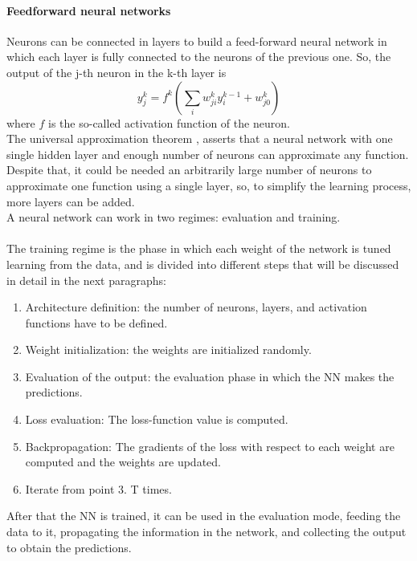 \paragraph*{Feedforward neural networks}
Neurons can be connected in layers to build a feed-forward neural network in which each layer is fully connected to the neurons of the previous one.
So, the output of the j-th neuron in the k-th layer is
\begin{equation}
    y^k_{j}=  f^k\left(\sum_i w^k_{ji} y^{k-1}_i + w_{j0}^k\right)
\end{equation}
where $f$ is the so-called activation function of the neuron.\\
The universal approximation theorem \cite{Hornik1989MultilayerApproximators}, asserts that a neural network with one single hidden layer and enough number of neurons can approximate any function.\\
Despite that, it could be needed an arbitrarily large number of neurons to approximate one function using a single layer, so, to simplify the learning process, more layers can be added.\\
A neural network can work in two regimes: evaluation and training.\\
\\
The training regime is the phase in which each weight of the network is tuned learning from the data, and is divided into different steps that will be discussed in detail in the next paragraphs:
\begin{enumerate}
    \item Architecture definition: the number of neurons, layers, and activation functions have to be defined.
    \item Weight initialization: the weights are initialized randomly.
    \item Evaluation of the output: the evaluation phase in which the NN makes the predictions.
    \item Loss evaluation: The loss-function value is computed.
    \item Backpropagation: The gradients of the loss with respect to each weight are computed and the weights are updated.
    \item Iterate from point 3. T times.
\end{enumerate}
After that the NN is trained, it can be used in the evaluation mode, feeding the data to it, propagating the information in the network, and collecting the output to obtain the predictions.\\

